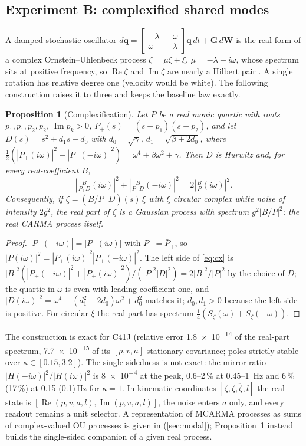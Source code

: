 \documentclass[conference]{IEEEtran}
\DeclareRobustCommand{\vct}[1]{\bm{#1}}
\DeclareRobustCommand{\mat}[1]{\bm{#1}}
\theoremstyle{bodysmall}
\newtheorem{proposition}{Proposition}
\begin{document}
\subsection{Experiment B: complexified shared modes}
A damped stochastic oscillator
$d\vct q=\left[\begin{smallmatrix}-\lambda&-\omega\\\omega&-\lambda\end{smallmatrix}\right]\vct q\,dt+\mat G\,d\vct W$
is the real form of a complex Ornstein--Uhlenbeck process
$\dot\zeta=\mu\zeta+\xi$, $\mu=-\lambda+i\omega$, whose spectrum sits at
positive frequency, so $\operatorname{Re}\zeta$ and $\operatorname{Im}\zeta$
are nearly a Hilbert pair \cite{gabor46,schreier10}. A single rotation has
relative degree one (velocity would be white). The following construction
raises it to three and keeps the baseline law exactly.
\begin{proposition}[Complexification]
\label{prop:cx}
Let $P$ be a real monic quartic with roots $p_1,\bar p_1,p_2,\bar p_2$,
$\operatorname{Im}p_k>0$, $P_+(s)=(s-p_1)(s-p_2)$, and let $D(s)=s^2+d_1s+d_0$
with $d_0=\sqrt\gamma$, $d_1=\sqrt{\beta+2d_0}$, where
$\tfrac12(|P_+(i\omega)|^2+|P_+(-i\omega)|^2)=\omega^4+\beta\omega^2+\gamma$.
Then $D$ is Hurwitz and, for every real-coefficient $B$,
\begin{equation}
\left|\tfrac{B}{P_+D}(i\omega)\right|^2+\left|\tfrac{B}{P_+D}(-i\omega)\right|^2
=2\left|\tfrac{B}{P}(i\omega)\right|^2 .
\label{eq:cx}
\end{equation}
Consequently, if $\zeta=(B/P_+D)(s)\,\xi$ with $\xi$ circular complex white
noise of intensity $2g^2$, the real part of $\zeta$ is a Gaussian process
with spectrum $g^2|B/P|^2$: the real CARMA process itself.
\end{proposition}
\begin{proof}
$|P_+(-i\omega)|=|P_-(i\omega)|$ with $P_-=\bar P_+$, so
$|P(i\omega)|^2=|P_+(i\omega)|^2|P_+(-i\omega)|^2$. The left side of
\eqref{eq:cx} is
$|B|^2(|P_+(-i\omega)|^2+|P_+(i\omega)|^2)/(|P|^2|D|^2)=2|B|^2/|P|^2$ by the
choice of $D$; the quartic in $\omega$ is even with leading coefficient one,
and $|D(i\omega)|^2=\omega^4+(d_1^2-2d_0)\omega^2+d_0^2$ matches it; $d_0,d_1>0$
because the left side is positive. For circular $\xi$ the real part has
spectrum $\tfrac14(S_\zeta(\omega)+S_\zeta(-\omega))$.
\end{proof}
The construction is exact for C41J (relative error \num{1.8e-14} of the
real-part spectrum, \num{7.7e-15} of its $[p,v,a]$ stationary covariance;
poles strictly stable over $\kappa\in[0.15,3.2]$). The single-sidedness is
not exact: the mirror ratio $|H(-i\omega)|^2/|H(i\omega)|^2$ is \num{8e-4} at
the peak, 0.6--2\,\% at 0.45--\SI{1}{Hz} and 6\,\% (17\,\%) at 0.15
(0.1)\,Hz for $\kappa=1$. In kinematic coordinates
$[\zeta,\dot\zeta,\ddot\zeta,l]$ the real state is
$[\operatorname{Re}(p,v,a,l),\operatorname{Im}(p,v,a,l)]$, the noise enters
$a$ only, and every readout remains a unit selector. A representation of
MCARMA processes as sums of complex-valued OU processes is given in
\cite{fasen21} (\cref{sec:modal}); Proposition~\ref{prop:cx} instead builds
the single-sided companion of a given real process.
\end{document}
